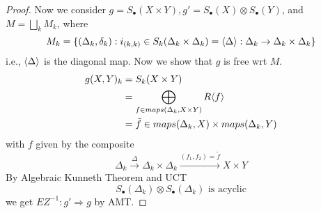 \begin{proof}
    Now we consider $g=S_\bullet(X\times Y), g'=S_\bullet(X)\otimes S_\bullet(Y)$, and $M=\bigsqcup_kM_k$, where 
    \begin{equation*}
        M_k=\{(\Delta_k,\delta_k):i_{(k,k)}\in S_k(\Delta_k\times\Delta_k)=\langle\Delta\rangle:\Delta_k\to\Delta_k\times\Delta_k\}
    \end{equation*}
    i.e., $\langle\Delta\rangle$ is the diagonal map. Now we show that $g$ is free wrt $M$. 
    \begin{align*}
        g(X,Y)_k&=S_k(X\times Y)\\
        &=\bigoplus_{f\in maps(\Delta_k,X\times Y)}R\langle f\rangle\\
        &=\tilde{f}\in maps(\Delta_k,X)\times maps(\Delta_k,Y)
    \end{align*}
    with $f$ given by the composite 
    \begin{equation*}
        \Delta_k\xrightarrow{\Delta}\Delta_k\times\Delta_k\xrightarrow{(f_1,f_2)=\tilde{f}}X\times Y
    \end{equation*}
    By Algebraic Kunneth Theorem and UCT
    \begin{equation*}
        S_\bullet(\Delta_k)\otimes S_\bullet(\Delta_k) \text{ is acyclic}
    \end{equation*}
    we get $EZ^{-1}:g'\Rightarrow g$ by AMT.
\end{proof}






